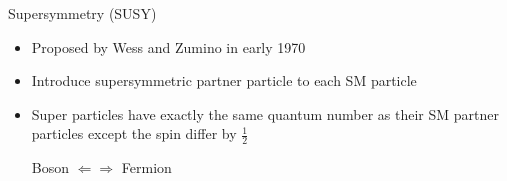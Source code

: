 \documentclass[10pt]{beamer}
\begin{document}
{

\begin{frame}{Supersymmetry (SUSY)}
    \begin{itemize}
        \item Proposed by Wess and Zumino in early 1970
        \item Introduce supersymmetric partner particle to each SM particle
        \item Super particles have exactly the same quantum number as their SM partner particles except the spin differ by $\frac{1}{2}$
        \begin{center}
            Boson $\Leftarrow \Rightarrow$ Fermion
        \end{center}
    \end{itemize}
\end{frame}

}
\end{document}
